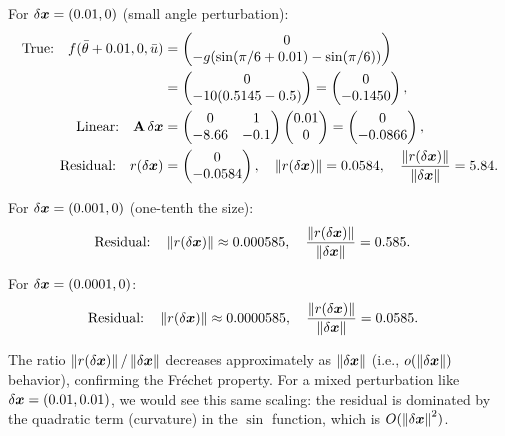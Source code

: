 For $\delta\bm{x} = (0.01, 0)$ (small angle perturbation):
\begin{align}
\text{True:} \quad f(\bar\theta + 0.01, 0, \bar{u}) &= \begin{pmatrix} 0 \\ -g(\sin(\pi/6 + 0.01) - \sin(\pi/6)) \end{pmatrix} \\
&= \begin{pmatrix} 0 \\ -10(0.5145 - 0.5) \end{pmatrix} = \begin{pmatrix} 0 \\ -0.1450 \end{pmatrix}, \\
\text{Linear:} \quad \mathbf{A}\,\delta\bm{x} &= \begin{pmatrix} 0 & 1 \\ -8.66 & -0.1 \end{pmatrix} \begin{pmatrix} 0.01 \\ 0 \end{pmatrix} = \begin{pmatrix} 0 \\ -0.0866 \end{pmatrix}, \\
\text{Residual:} \quad r(\delta\bm{x}) &= \begin{pmatrix} 0 \\ -0.0584 \end{pmatrix}, \quad \left\lVert r(\delta\bm{x}) \right\rVert = 0.0584, \quad \frac{\left\lVert r(\delta\bm{x}) \right\rVert}{\left\lVert \delta\bm{x} \right\rVert} = 5.84.
\end{align}

For $\delta\bm{x} = (0.001, 0)$ (one-tenth the size):
\begin{align}
\text{Residual:} \quad \left\lVert r(\delta\bm{x}) \right\rVert &\approx 0.000585, \quad \frac{\left\lVert r(\delta\bm{x}) \right\rVert}{\left\lVert \delta\bm{x} \right\rVert} = 0.585.
\end{align}

For $\delta\bm{x} = (0.0001, 0)$:
\begin{align}
\text{Residual:} \quad \left\lVert r(\delta\bm{x}) \right\rVert &\approx 0.0000585, \quad \frac{\left\lVert r(\delta\bm{x}) \right\rVert}{\left\lVert \delta\bm{x} \right\rVert} = 0.0585.
\end{align}

The ratio $\left\lVert r(\delta\bm{x}) \right\rVert/\left\lVert \delta\bm{x} \right\rVert$ decreases approximately as $\left\lVert \delta\bm{x} \right\rVert$ (i.e., $o(\left\lVert \delta\bm{x} \right\rVert)$
behavior), confirming the Fréchet property. For a mixed perturbation like $\delta\bm{x} = (0.01, 0.01)$,
we would see this same scaling: the residual is dominated by the quadratic term (curvature)
in the $\sin$ function, which is $O(\left\lVert \delta\bm{x} \right\rVert^2)$.

